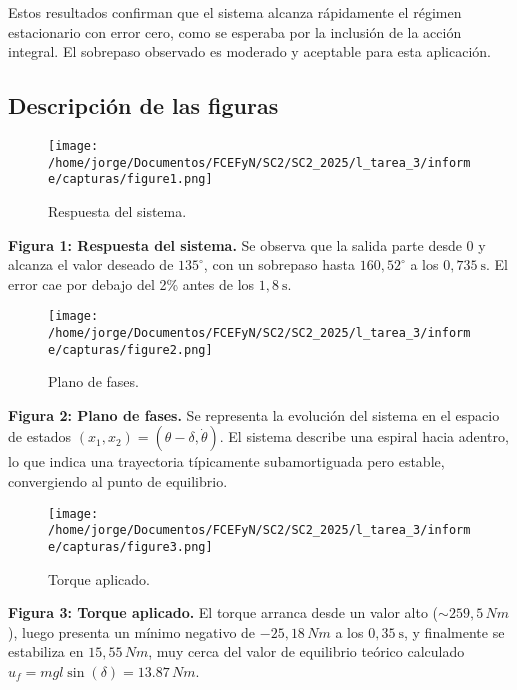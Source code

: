 \documentclass[11pt]{article}
\begin{document}
Estos resultados confirman que el sistema alcanza rápidamente el régimen estacionario con error cero, como se esperaba por la inclusión de la acción integral. El sobrepaso observado es moderado y aceptable para esta aplicación.
\newpage

\subsection*{Descripción de las figuras}


    \begin{figure}[ht]
          \centering
            \texttt{[image: /home/jorge/Documentos/FCEFyN/SC2/SC2\_2025/l\_tarea\_3/informe/capturas/figure1.png]}
              \caption{Respuesta del sistema.}
            \end{figure} 

\textbf{Figura 1: Respuesta del sistema.} Se observa que la salida parte desde 0 y alcanza el valor deseado de \( 135^\circ \), con un sobrepaso hasta \( 160{,}52^\circ \) a los \( 0{,}735 \ \text{s} \). El error cae por debajo del 2\% antes de los \( 1{,}8 \ \text{s} \).


    \begin{figure}[ht]
          \centering
            \texttt{[image: /home/jorge/Documentos/FCEFyN/SC2/SC2\_2025/l\_tarea\_3/informe/capturas/figure2.png]}
              \caption{Plano de fases.}
            \end{figure} 

\textbf{Figura 2: Plano de fases.} Se representa la evolución del sistema en el espacio de estados \((x_1, x_2) = (\theta - \delta, \dot{\theta})\). El sistema describe una espiral hacia adentro, lo que indica una trayectoria típicamente subamortiguada pero estable, convergiendo al punto de equilibrio.


    \begin{figure}[ht]
          \centering
            \texttt{[image: /home/jorge/Documentos/FCEFyN/SC2/SC2\_2025/l\_tarea\_3/informe/capturas/figure3.png]}
              \caption{Torque aplicado.}
            \end{figure} 
\newpage

\textbf{Figura 3: Torque aplicado.} El torque arranca desde un valor alto (\( \sim 259{,}5 \,Nm \)), luego presenta un mínimo negativo de \( -25{,}18 \, Nm \) a los \( 0{,}35 \ \text{s} \), y finalmente se estabiliza en \( 15{,}55 \, Nm \), muy cerca del valor de equilibrio teórico calculado \( u_f = mgl \sin(\delta)=13.87 \, Nm \).
\end{document}
